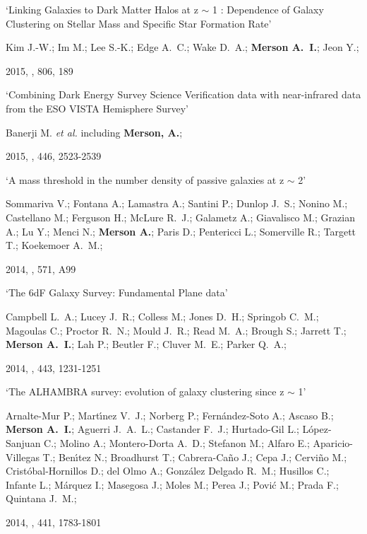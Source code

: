 \begin{etaremune}[leftmargin=15pt]
\item \label{itm:Kim2015} `Linking Galaxies to Dark Matter Halos at z $\sim$ 1 : Dependence of Galaxy Clustering on Stellar Mass and Specific Star Formation Rate'\newline
  \begin{small}Kim J.-W.; Im M.; Lee S.-K.; Edge A.~C.; Wake D.~A.; \textbf{Merson A.~I.}; Jeon Y.;\end{small} 2015, \apj, 806, 189

\item \label{itm:Banerji2015} `Combining Dark Energy Survey Science Verification data with near-infrared data from the ESO VISTA Hemisphere Survey'\newline
  \begin{small}Banerji M. \textit{et al.} including \textbf{Merson, A.};\end{small} 2015, \mnras, 446, 2523-2539

\item \label{itm:Sommariva2014} `A mass threshold in the number density of passive galaxies at z $\sim$ 2'\newline
  \begin{small}Sommariva V.; Fontana A.; Lamastra A.; Santini P.; Dunlop J.~S.; Nonino M.; Castellano M.; Ferguson H.; McLure R.~J.; Galametz A.; Giavalisco M.; Grazian A.; Lu Y.; Menci N.; \textbf{Merson A.}; Paris D.; Pentericci L.; Somerville R.; Targett T.; Koekemoer A.~M.;\end{small} 2014, \aap, 571, A99

\item \label{itm:Campbell2014} `The 6dF Galaxy Survey: Fundamental Plane data'\newline
  \begin{small}Campbell L.~A.; Lucey J.~R.; Colless M.; Jones D.~H.; Springob C.~M.; Magoulas C.; Proctor R.~N.; Mould J.~R.; Read M.~A.; Brough S.; Jarrett T.; \textbf{Merson A.~I.}; Lah P.; Beutler F.; Cluver M.~E.; Parker Q.~A.;\end{small} 2014, \mnras, 443, 1231-1251

\item \label{itm:Arnalte-Mur2014} `The ALHAMBRA survey: evolution of galaxy clustering since z $\sim$ 1'\newline
  \begin{small}Arnalte-Mur P.; Mart{\'{\i}}nez V.~J.; Norberg P.; Fern{\'a}ndez-Soto A.; Ascaso B.; \textbf{Merson A.~I.}; Aguerri J.~A.~L.; Castander F.~J.; Hurtado-Gil L.; L{\'o}pez-Sanjuan C.; Molino A.; Montero-Dorta A.~D.; Stefanon M.; Alfaro E.; Aparicio-Villegas T.; Ben{\'{\i}}tez N.; Broadhurst T.; Cabrera-Ca{\~n}o J.; Cepa J.; Cervi{\~n}o M.; Crist{\'o}bal-Hornillos D.; del Olmo A.; Gonz{\'a}lez Delgado R.~M.; Husillos C.; Infante L.; M{\'a}rquez I.; Masegosa J.; Moles M.; Perea J.; Povi{\'c} M.; Prada F.; Quintana J.~M.;\end{small} 2014, \mnras, 441, 1783-1801


\end{etaremune}
